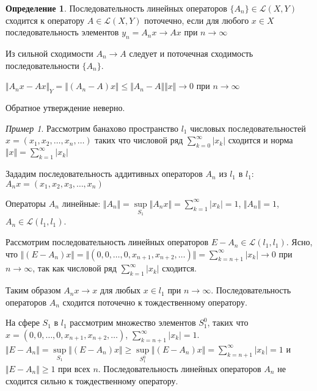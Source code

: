 \documentclass[12pt,a4paper,titlepage,oneside]{book}
\theoremstyle{definition}
\newtheorem*{definition}{Определение}
\theoremstyle{plain}
\theoremstyle{break}
\theoremstyle{remark}
\theoremstyle{remark}
\newtheorem*{example}{Пример}
\theoremstyle{remark}
\theoremstyle{remark}
\theoremstyle{plain}
\theoremstyle{plain}
\begin{document}
\begin{definition}
Последовательность линейных операторов $\{A_n\}\in \mathcal{L}(X,Y)$ сходится к оператору $A\in \mathcal{L}(X,Y)$ поточечно, если для любого $x\in X$ последовательность элементов $y_n=A_nx\to Ax$ при $n\to \infty$
\end{definition}

Из сильной сходимости $A_n\to A$ следует и поточечная сходимость последовательности $\{A_n\}$.

\begin{center}
$\Vert A_nx-Ax\Vert_Y = \Vert(A_n-A)x\Vert\le \Vert A_n-A\Vert \Vert x\Vert\to 0$ при $n\to \infty$
\end{center}

Обратное утверждение неверно.

\begin{example}
Рассмотрим банахово пространство $l_1$ числовых последовательностей $x=(x_1,x_2,\ldots,x_n,\ldots)$ таких что числовой ряд $\displaystyle\sum_{k=0}^\infty \lvert x_k\rvert $ сходится и норма $\Vert x\Vert=\displaystyle\sum_{k=1}^\infty \lvert x_k\rvert $

Зададим последовательность аддитивных операторов $A_n$ из $l_1$ в $l_1$:
$A_nx=(x_1,x_2,x_3,\ldots,x_n)$

Операторы $A_n$ линейные:
$\Vert A_n\Vert=\sup \limits_{S_1} \Vert A_nx\Vert=\displaystyle\sum_{k=1}^\infty \lvert x_k\rvert =1$, $\Vert A_n\Vert=1$, $A_n\in \mathcal{L}(l_1,l_1)$.

Рассмотрим последовательность линейных операторов $E-A_n\in \mathcal{L}(l_1,l_1)$. Ясно, что $\Vert(E-A_n)x\Vert=\Vert(0,0,\ldots,0,x_{n+1},x_{n+2},\ldots)\Vert=\displaystyle\sum_{k=n+1}^\infty \lvert x_k\rvert  \to 0$ при $n\to \infty$, так как числовой ряд $\displaystyle\sum_{k=1}^\infty \lvert x_k\rvert $ сходится.

Таким образом $A_nx\to x$ для любых $x\in l_1$ при $n\to \infty$. Последовательность операторов $A_n$ сходится поточечно к тождественному оператору.

На сфере $S_1$ в $l_1$ рассмотрим множество элементов $S_1^0$, таких что $x=(0,0,\ldots,0,x_{n+1},x_{n+2},\ldots)$, $\displaystyle\sum_{k=n+1}^\infty \lvert x_k\rvert=1$.
$\Vert E-A_n\Vert=\sup \limits_{S_1} \Vert(E-A_n)x\Vert\ge \sup \limits_{S_1^0} \Vert(E-A_n)x\Vert=\displaystyle\sum_{k=n+1}^\infty \lvert x_k\rvert=1$ и $\Vert E-A_n\Vert\ge 1$ при всех $n$. Последовательность линейных операторов $A_n$ не сходится сильно к тождественному оператору.

\end{example}
\end{document}
